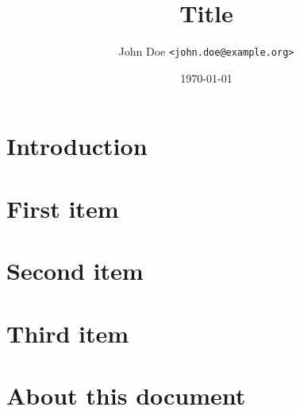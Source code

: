 \documentclass[10pt,a4paper,twoside,twocolumn]{article}
\title{Title}
\author{John Doe \texttt{<john.doe@example.org>}}
\date{\today}
\begin{document}
\maketitle

\begin{abstract}
\end{abstract}

\section{Introduction}

\section{First item}

\section{Second item}


\section{Third item}

\appendix
\section{About this document}
\end{document}
